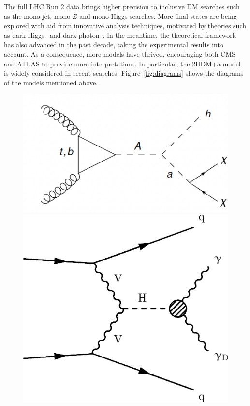 \documentclass{moriond}
\begin{document}
The full LHC Run 2 data brings higher
precision to inclusive DM searches such as the mono-jet, mono-$Z$ and
mono-Higgs searches. More final states are being explored with aid from
innovative analysis techniques, motivated by theories such as dark
Higgs~\cite{DarkH} and dark photon~\cite{DarkPh}. In the meantime, the
theoretical framework has also advanced in the past decade, taking the
experimental results into account. As a consequence, more models have thrived,
encouraging both CMS and ATLAS to provide more interpretations. In particular,
the 2HDM+a model~\cite{2HDM} is widely considered in recent searches.
Figure~\ref{fig:diagrams} shows the diagrams of the models mentioned above.

\begin{figure} [htb]
\begin{minipage}{0.32\linewidth}
\centerline{\includegraphics[width=0.7\linewidth]{2HDM_a}}
\end{minipage}
\begin{minipage}{0.32\linewidth}
\centerline{\includegraphics[width=0.7\linewidth]{HiggsDarkPhotonDiagram}}
\end{minipage}
\begin{minipage}{0.32\linewidth}

\end{minipage}
\end{figure}
\end{document}
